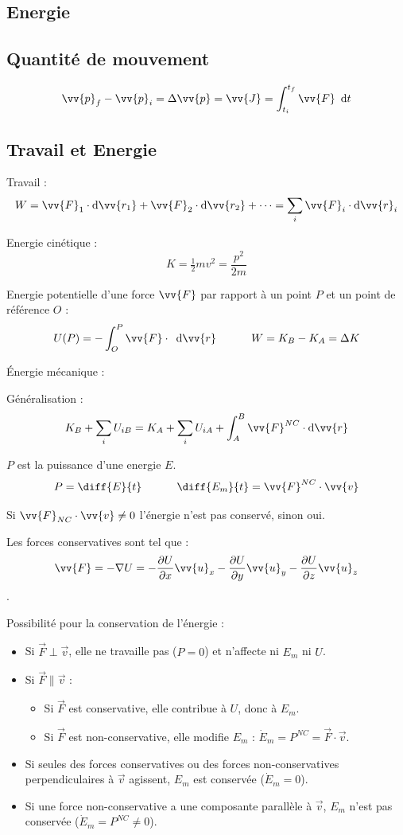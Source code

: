 \documentclass[landscape,a4paper]{article}
\newcommand{\req}[2]{
  \begin{center}
    \scalebox{#1}{
      \begin{tabular}{c}
        \(\displaystyle
        #2
        \)
      \end{tabular}
    }
  \end{center}
}
\newcommand{\dee}[1]{
  \,\,\,\mathrm{d}{#1}
}
\newcommand{\F}{\ensuremath{\vv{F}}}
\newcommand{\pos}{\ensuremath{\vv{r}}}
\newcommand{\vi}{\ensuremath{\vv{v}}}
\newcommand{\ux}{\ensuremath{\vv{u}_x}}
\newcommand{\uy}{\ensuremath{\vv{u}_y}}
\newcommand{\uz}{\ensuremath{\vv{u}_z}}
\begin{document}
\begin{multicols}{4}
  \section{Energie}
  \subsection{Quantité de mouvement}
  \[
    \vv{p}_f - \vv{p}_i = \Delta\vv{p} = \vv{J} = \int_{t_i}^{t_f}\F\dee{t}
  \]

  \subsection{Travail et Energie}

  Travail : 
  \[
    W= \F_1\cdot\mathrm{d}\vv{r_1} + \F_2\cdot\mathrm{d}\vv{r_2} + \dots =\sum_i \F_i\cdot\mathrm{d}\pos_i
  \]

  Energie cinétique :
  \[
    K = \tfrac{1}{2}mv^2 = \frac{p^2}{2m}
  \]

  Energie potentielle d'une force \F{} par rapport à un point \(P\) et un point de référence \(O\) : 
  \[
    U(P)=-\int_O^P\F\cdot\dee{\pos}\phantom{texttex} W = K_B - K_A = \Delta K
  \]

  Énergie mécanique :
  \req{1}{
    E_m = K + \sum_i U_i
  }

  Généralisation : 
  \[
    K_B + \sum_i U_{iB} = K_A + \sum_i U_{iA} + \int_A^B \F^{NC}\cdot\mathrm{d}\pos
  \]

  \(P\) est la puissance d'une energie \(E\). 
  \[
    P = \diff{E}{t} \phantom{textext} \diff{E_m}{t} = \F^{NC}\cdot\vi
  \]

  Si \(\F_{NC}\cdot\vi \neq 0 \) l'énergie n'est pas conservé, sinon oui. 

  Les forces conservatives sont tel que :
  \[
    \F=-\nabla U=-\frac{\partial U}{\partial x}\ux-\frac{\partial U}{\partial y}\uy-\frac{\partial U}{\partial z}\uz
  \].

  Possibilité pour la conservation de l'énergie : 
  \begin{itemize}
    \item Si \(\vec{F} \perp \vec{v}\), elle ne travaille pas (\(P = 0\)) et n'affecte ni \(E_m\) ni \(U\).
    \item Si \(\vec{F} \parallel \vec{v}\) :
      \begin{itemize}
        \item Si \(\vec{F}\) est conservative, elle contribue à \(U\), donc à \(E_m\).
        \item Si \(\vec{F}\) est non-conservative, elle modifie \(E_m\) : \(\dot{E}_m = P^{NC} = \vec{F} \cdot \vec{v}\).
      \end{itemize}
    \item Si seules des forces conservatives ou des forces non-conservatives perpendiculaires à \(\vec{v}\) agissent, \(E_m\) est conservée (\(\dot{E}_m = 0\)).
    \item Si une force non-conservative a une composante parallèle à \(\vec{v}\), \(E_m\) n'est pas conservée (\(\dot{E}_m = P^{NC} \neq 0\)).
  \end{itemize}


\end{multicols}
\end{document}
